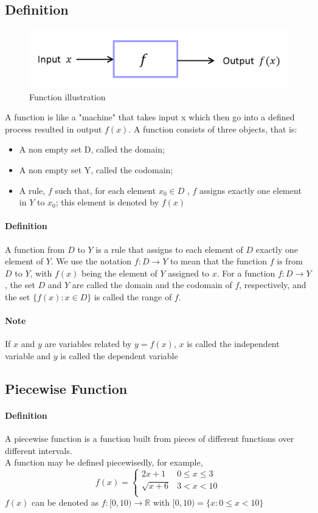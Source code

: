 \documentclass[12pt]{article}
\begin{document}
\subsection{Definition}
\begin{figure}[h!]
    \centering
    \includegraphics[width=0.7\linewidth]{images/function.png}
    \caption{Function illustration}
    \label{fig:function}
\end{figure}
A function is like a "machine" that takes input x which then go into a defined process 
resulted in output $f(x)$.
A function consists of three objects, that is:
\begin{itemize}
    \item A non empty set D, called the domain;
    \item A non empty set Y, called the codomain;
    \item A rule, $f$ such that, for each element $x_0 \in D$ , $f$ assigns
          exactly one element in $Y$ to $x_0$; this element is denoted by $f(x)$
\end{itemize}
\paragraph{Definition} A function from $D$ to $Y$ is a rule that assigns to each element
of $D$ exactly one element of $Y$. We use the notation $ f : D \rightarrow Y $ to mean that the function $f$ is
from $D$ to $Y$, with $f(x)$ being the element of $Y$ assigned to $x$.
For a function $f : D \rightarrow Y $ , the set $D$ and $Y$ are called the
domain and the codomain of $f$, respectively, and the set $\{f(x) : x \in D \} $ is called the range of $f$.

\paragraph{Note} If $x$ and $y$ are variables related by $y = f(x)$, $x$ is called the independent variable and
$y$ is called the dependent variable
\subsection{Piecewise Function}
\paragraph{Definition} A piecewise function is a function built from pieces of different functions over different intervals. \\
A function may be defined piecewisedly, for example,
\[
f(x) = 
\begin{cases}
    2x + 1 & 0 \leq x \leq 3 \\
    \sqrt{x + 6} & 3 < x < 10 \\
\end{cases}
\]
$f(x)$ can be denoted as $f : [0, 10) \rightarrow \mathbb{R} $ with $ [0, 10) = \{x : 0 \leq x < 10\} $
\end{document}
